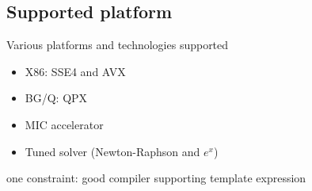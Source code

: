 \documentclass{beamer}
\begin{document}
\subsection*{Supported platform }
\begin{frame}[fragile]

\begin{center}
Various platforms and technologies supported

\begin{itemize}
\item X86: SSE4 and AVX
\item BG/Q: QPX
\item MIC accelerator
\item Tuned solver (Newton-Raphson and $e^x$)
\end{itemize}

one constraint: good compiler supporting template expression 
\end{center}
\end{frame}
\end{document}

